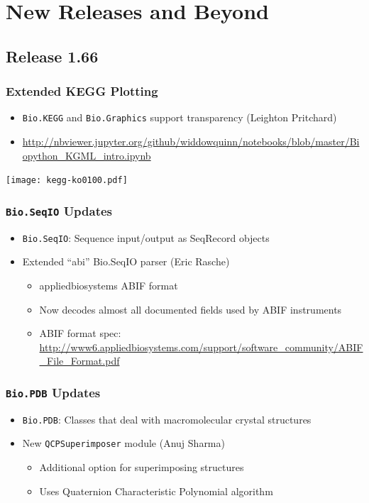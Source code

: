 \documentclass[trans]{beamer}
\begin{document}

\section{New Releases and Beyond}
\subsection*{Release 1.66}
\frame
{
}

\frame
{
  \frametitle{Extended KEGG Plotting}
  
  \begin{itemize}
  \item \texttt{Bio.KEGG} and \texttt{Bio.Graphics} support transparency (Leighton Pritchard)
  \item \url{http://nbviewer.jupyter.org/github/widdowquinn/notebooks/blob/master/Biopython_KGML_intro.ipynb}
  \end{itemize}
  
  \begin{center}
  \texttt{[image: kegg-ko0100.pdf]}
  \end{center}
}

\frame
{
  \frametitle{\texttt{Bio.SeqIO} Updates}
  
  \begin{itemize}
  \item \texttt{Bio.SeqIO}: Sequence input/output as SeqRecord objects  
  \item Extended ``abi'' Bio.SeqIO parser (Eric Rasche)
  \begin{itemize}
  \item appliedbiosystems ABIF format
  \item Now decodes almost all documented fields used by ABIF instruments
  \item ABIF format spec: \url{http://www6.appliedbiosystems.com/support/software_community/ABIF_File_Format.pdf}
  \end{itemize}
  \end{itemize}
}

\frame
{
  \frametitle{\texttt{Bio.PDB} Updates}
  
  \begin{itemize}
  \item \texttt{Bio.PDB}: Classes that deal with macromolecular crystal structures  
  \item New \texttt{QCPSuperimposer} module (Anuj Sharma)
  \begin{itemize}
  \item Additional option for superimposing structures
  \item Uses Quaternion Characteristic Polynomial algorithm
  \end{itemize}
  \end{itemize}
  
  
}
\end{document}
